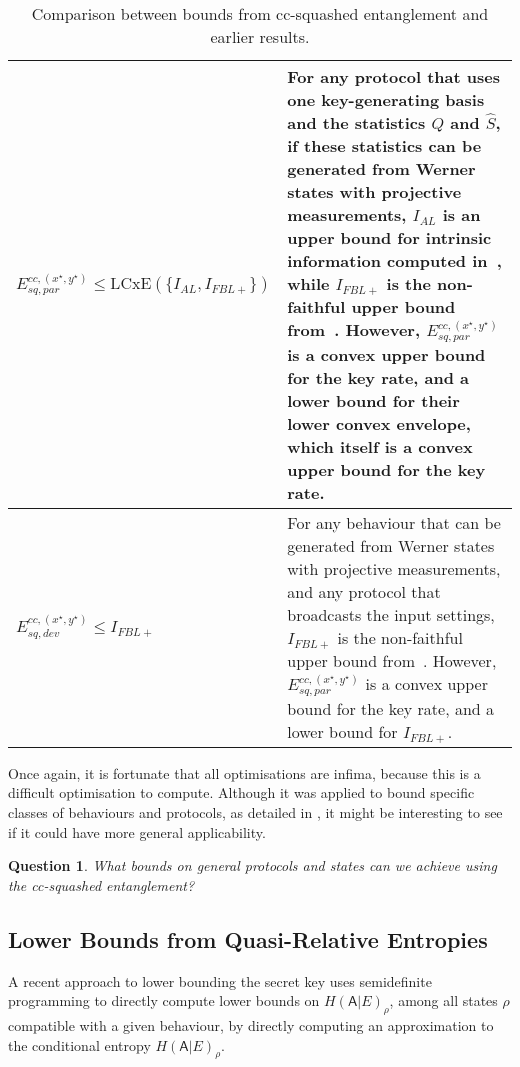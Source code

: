 \documentclass[10pt, a4paper]{article}
\numberwithin{equation}{section} %
\theoremstyle{definition}
\theoremstyle{plain}
\newtheorem{question}{Question}
\newenvironment{Tabular}[1] %
{\def\arraystretch{1.75}\begin{tabular}{#1}}
{\end{tabular}}
\newcommand{\tableline}[1]{\dimexpr #1\linewidth-2\tabcolsep}
\newcommand{\?}{\mathrel{?}} %
\newcommand{\crv}[1]{\mathsf{#1}}
\newcommand{\LCxE}[1]{\mathrm{LCxE}\left(#1\right)}
\begin{document}
    \begin{table}
      \begin{Tabular}{| >{\centering}m{\tableline{0.3}}|m{\tableline{0.7}}|}
        \hline
        \( E^{cc,(x^{\star},y^{\star})}_{sq,par} \leq \LCxE{\{I_{AL}, I_{FBL+}\}} \) & For any protocol that uses one key-generating basis and the statistics \(Q\) and \(\hat{S}\), if these statistics can be generated from Werner states with projective measurements, \(I_{AL}\) is an upper bound for intrinsic information computed in~\cite{RevisedPeres}, while \(I_{FBL+}\) is the non-faithful upper bound from~\cite{NotSufficient}. However, \(E^{cc,(x^{\star},y^{\star})}_{sq,par}\) is a convex upper bound for the key rate, and a lower bound for their lower convex envelope, which itself is a convex upper bound for the key rate. \\ \hline
        \( E^{cc,(x^{\star},y^{\star})}_{sq,dev} \leq I_{FBL+} \) & For any behaviour that can be generated from Werner states with projective measurements, and any protocol that broadcasts the input settings, \(I_{FBL+}\) is the non-faithful upper bound from~\cite{NotSufficient}. However, \(E^{cc,(x^{\star},y^{\star})}_{sq,par}\) is a convex upper bound for the key rate, and a lower bound for \(I_{FBL+}\). \\ \hline
      \end{Tabular}
      \caption{\label{tab:ccsqcomp} Comparison between bounds from cc-squashed entanglement and earlier results.}
    \end{table}

    Once again, it is fortunate that all optimisations are infima, because this is a difficult optimisation to compute. Although it was applied to bound specific classes of behaviours and protocols, as detailed in , it might be interesting to see if it could have more general applicability.

    \begin{question}
      What bounds on general protocols and states can we achieve using the cc-squashed entanglement?
    \end{question}

    \subsection{Lower Bounds from Quasi-Relative Entropies}\label{sec:diqkd_qre}

    A recent approach to lower bounding the secret key uses semidefinite programming to directly compute lower bounds on \(H{(\crv{A}|E)}_{\rho}\), among all states \(\rho\) compatible with a given behaviour, by directly computing an approximation to the conditional entropy \(H{(\crv{A}|E)}_{\rho}\).
\end{document}
